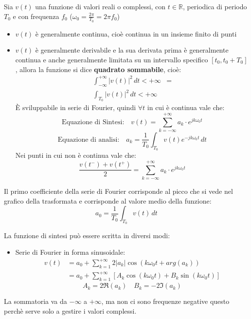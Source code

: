 \documentclass[a4paper]{article}
\begin{document}
\begin{theorem}
  Sia \( v(t) \) una funzione di valori reali o complessi, con \( t \in \mathbb{R} \),
  periodica di periodo \( T_0 \) e con frequenza \( f_0 \) (\( \omega_0 = \frac{2 \pi }
  {T_0} = 2 \pi f_0 \))
  \begin{itemize}
    \item \( v(t) \) è generalmente continua, cioè continua in un insieme finito di punti
    \item \( v(t) \) è generalmente derivabile e la sua derivata prima è generalmente
      continua e anche generalmente limitata su un intervallo specifico \( [t_0, t_0 + T_0] \),
      allora la funzione si dice \textbf{quadrato sommabile}, cioè:
      \[
        \begin{aligned}
          \int_{-\infty}^{+\infty} |v(t)|^2 \, dt < +\infty &=\\
          \int_{T_0} |v(t)|^2 \, dt < +\infty&
        \end{aligned}
      \] 
      È sviluppabile in serie di Fourier, quindi \( \forall t \) in cui è continua vale che:
      \[
        \text{Equazione di Sintesi:} \quad
        v(t) = \sum_{k=-\infty}^{+\infty} a_k \cdot e^{j k \omega_0 t}
      \] 
      \[
        \text{Equazione di analisi:} \quad
        a_k = \frac{1}{T_0} \int_{T_0} v(t) e^{-j k \omega_0 t} \, dt
      \] 
      Nei punti in cui non è continua vale che:
      \[
        \frac{v(t^-) + v(t^+)}{2} = \sum_{k=-\infty}^{+\infty} a_k \cdot e^{j k \omega_0 t}
      \] 
  \end{itemize}
  Il primo coefficiente della serie di Fourier corrisponde al picco che si vede nel
  grafico della trasformata e corrisponde al valore medio della funzione:
  \[
    a_0 = \frac{1}{T_0} \int_{T_0} v(t) \, dt
  \] 

  \vspace{1em}
  \noindent
  La funzione di sintesi può essere scritta in diversi modi:
  \begin{itemize}
    \item Serie di Fourier in forma sinusoidale:
      \[
        \begin{aligned}
          v(t) &= a_0 + \sum_{k=1}^{+\infty} 2 \left| a_k \right|  \cos(k \omega_0 t + arg(a_k))\\
               &= a_0 + \sum_{k=1}^{+\infty} \left[ A_k \cos(k \omega_0 t) + B_k \sin(k \omega_0 t) \right]
        \end{aligned}
      \] 
      \[
      A_k = 2 \Re(a_k) \quad B_k = -2 \Im(a_k)
      \] 
  \end{itemize}
  La sommatoria va da \( -\infty \) a \( +\infty \), ma non ci sono frequenze negative
  questo perchè serve solo a gestire i valori complessi.
\end{theorem}
\end{document}
